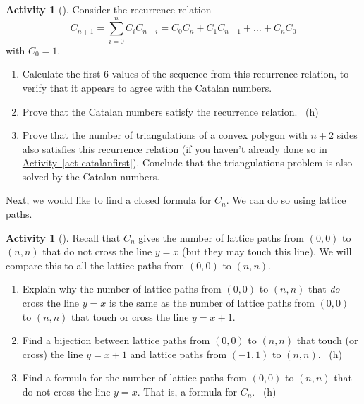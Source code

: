 \documentclass[10pt,]{book}
\theoremstyle{plain}
\theoremstyle{definition}
\theoremstyle{definition}
\theoremstyle{definition}
\newtheorem{activity}[project]{Activity}
\numberwithin{equation}{chapter}
\begin{document}
\begin{activity}[]\label{activity-174}
\hypertarget{p-1020}{}%
Consider the recurrence relation%
\begin{equation*}
C_{n + 1} = \sum_{i = 0}^n C_iC_{n-i} = C_{0}C_{n} + C_{1}C_{n - 1} + \ldots + C_{n}C_{0}
\end{equation*}
with \(C_0 = 1\).%
\begin{enumerate}[font=\bfseries,label=(\alph*),ref=\alph*]
\item\label{task-189} \hypertarget{p-1021}{}%
Calculate the first 6 values of the sequence from this recurrence relation, to verify that it appears to agree with the Catalan numbers.%
\item\label{task-190} \hypertarget{p-1022}{}%
Prove that the Catalan numbers satisfy the recurrence relation.%
~{\tiny (h)}\item\label{task-191} \hypertarget{p-1024}{}%
Prove that the number of triangulations of a convex polygon with \(n+2\) sides also satisfies this recurrence relation (if you haven't already done so in \hyperref[act-catalanfirst]{Activity~\ref{act-catalanfirst}}).  Conclude that the triangulations problem is also solved by the Catalan numbers.%
\end{enumerate}
\end{activity}
\hypertarget{p-1025}{}%
Next, we would like to find a closed formula for \(C_n\).  We can do so using lattice paths.%
\begin{activity}[]\label{activity-175}
\hypertarget{p-1026}{}%
Recall that \(C_n\) gives the number of lattice paths from \((0,0)\) to \((n,n)\) that do not cross the line \(y = x\) (but they may touch this line).  We will compare this to all the lattice paths from \((0,0)\) to \((n,n)\).%
\begin{enumerate}[font=\bfseries,label=(\alph*),ref=\alph*]
\item\label{task-192} \hypertarget{p-1027}{}%
Explain why the number of lattice paths from \((0,0)\) to \((n,n)\) that \emph{do} cross the line \(y = x\) is the same as the number of lattice paths from \((0,0)\) to \((n,n)\) that touch or cross the line \(y = x + 1\).%
\item\label{task-193} \hypertarget{p-1029}{}%
Find a bijection between lattice paths from \((0,0)\) to \((n,n)\) that touch (or cross) the line \(y=x+1\) and lattice paths from \((-1,1)\) to \((n,n)\).%
~{\tiny (h)}\item\label{task-194} \hypertarget{p-1032}{}%
Find a formula for the number of lattice paths from \((0,0)\) to \((n,n)\) that do not cross the line \(y=x\). That is, a formula for \(C_n\).%
~{\tiny (h)}\end{enumerate}
\end{activity}
\end{document}
